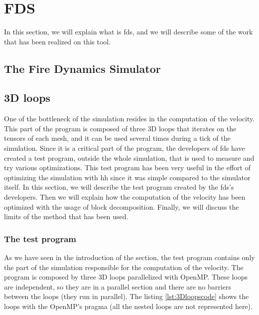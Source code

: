 
\section{FDS}

In this section, we will explain what is \gls{fds}, and we will describe some of
the work that has been realized on this tool.

\subsection{The Fire Dynamics Simulator}


\subsection{3D loops}

One of the bottleneck of the simulation resides in the computation of the
velocity. This part of the program is composed of three 3D loops that iterates
on the tensors of each mesh, and it can be used several times during a tick of
the simulation. Since it is a critical part of the program, the developers of
\gls{fds} have created a test program, outside the whole simulation, that is
used to measure and try various optimizations. This test program has been very
useful in the effort of optimizing the simulation with \gls{hh} since it was
simple compared to the simulator itself. In this section, we will describe the
test program created by the \gls{fds}'s developers. Then we will explain how the
computation of the velocity has been optimized with the usage of block
decomposition. Finally, we will discuss the limits of the method that has been
used.

\subsubsection{The test program}

As we have seen in the introduction of the section, the test program contains
only the part of the simulation responsible for the computation of the velocity.
The program is composed by three 3D loops parallelized with OpenMP. These loops
are independent, so they are in a parallel section and there are no barriers
between the loops (they run in parallel). The listing \ref{lst:3Dloopscode}
shows the loops with the OpenMP's pragma (all the nested loops are not
represented here).

